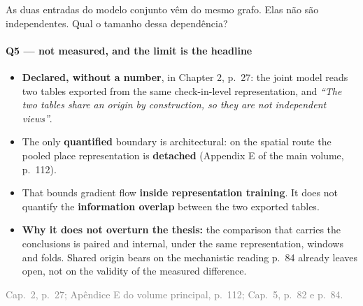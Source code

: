 \documentclass{beamer}
\begin{document}
\begin{frame}[noframenumbering]{As duas entradas do modelo conjunto vêm do mesmo grafo. Elas não são independentes. Qual o tamanho dessa dependência?}
    \framesubtitle{Q5 --- not measured, and the limit is the headline}
    \hypertarget{q5}{}
    \small
    \begin{itemize}\setlength{\itemsep}{0pt}\setlength{\parskip}{0pt}
        \item \textbf{Declared, without a number}, in Chapter 2, p.~27: the joint model reads two tables exported from the same check-in-level representation, and \textit{``The two tables share an origin by construction, so they are not independent views''}.
        \item The only \textbf{quantified} boundary is architectural: on the spatial route the pooled place representation is \textbf{detached} (Appendix E of the main volume, p.~112).
        \item That bounds gradient flow \textbf{inside representation training}. It does not quantify the \textbf{information overlap} between the two exported tables.
        \item \textbf{Why it does not overturn the thesis:} the comparison that carries the conclusions is paired and internal, under the same representation, windows and folds. Shared origin bears on the mechanistic reading p.~84 already leaves open, not on the validity of the measured difference.
    \end{itemize}
    \vfill
    {\scriptsize
    \begin{minipage}[b]{0.775\linewidth}\raggedright\textcolor{gray}{Cap.~2, p.~27; Apêndice E do volume principal, p.~112; Cap.~5, p.~82 e p.~84.}\end{minipage}\hfill
    \begin{minipage}[b]{0.20\linewidth}\raggedleft \hyperlink{b0}{}\end{minipage}}
\end{frame}
\end{document}

